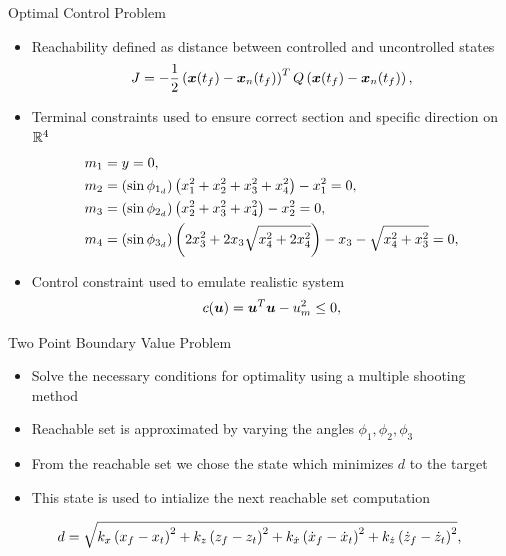 \documentclass[11pt,professionalfonts]{beamer}
\begin{document}
\begin{frame}{Optimal Control Problem}
\begin{itemize}
    \item Reachability defined as distance between controlled and uncontrolled states
    {\small
        \begin{align}\label{eq:cost}
            J = -\frac{1}{2} \left( \bm{x}(t_f) - \bm{x}_{n}(t_f)\right)^T 
            Q
            \left( \bm{x}(t_f) - \bm{x}_{n}(t_f)\right) ,
        \end{align}
    }
    \item Terminal constraints used to ensure correct section and specific direction on \( \mathbb{R}^4 \)
    {\small
        \begin{align}\label{eq:terminal_constraints}
            \begin{split}
                m_1 &= y = 0 , \\
                m_2 &= \left( \sin \phi_{1_{d}} \right) \left(  x_1^2 + x_2^2 + x_3^2 + x_4^2 \right) - x_1^2 = 0, \\
                m_3 &= \left( \sin \phi_{2_{d}} \right) \left(  x_2^2 + x_3^2 + x_4^2 \right) - x_2^2 = 0, \\
                m_4 &= \left( \sin \phi_{3_{d}} \right) \left(  2 x_3^2 + 2 x_3 \sqrt{x_4^2 + 2 x_4^2} \right) - x_3 - \sqrt{x_4^2 + x_3^2} = 0 ,
            \end{split}
        \end{align}
    }
    \item Control constraint used to emulate realistic system
        {\small
        \begin{align}\label{eq:control_constraint}
            c(\bm{u}) = \bm{u}^T \bm{u} - u_m^2 \leq 0 ,
        \end{align}
        }
\end{itemize}

\end{frame}

\begin{frame}{Two Point Boundary Value Problem}
\begin{itemize}
    \item Solve the necessary conditions for optimality using a multiple shooting method
    \item Reachable set is approximated by varying the angles \( \phi_1, \phi_2, \phi_3 \) 
    \item From the reachable set we chose the state which minimizes \( d \) to the target
    \item This state is used to intialize the next reachable set computation
\end{itemize}

\begin{align}\label{eq:reach_dist}
    d = \sqrt{k_x \left( x_f - x_t  \right)^2 + k_z \left( z_f - z_t  \right)^2 + k_{\dot{x}}\left( \dot{x}_f - \dot{x}_t  \right)^2 + k_{\dot{z}}\left( \dot{z}_f - \dot{z}_t  \right)^2} ,
\end{align}

\end{frame}
\end{document}
